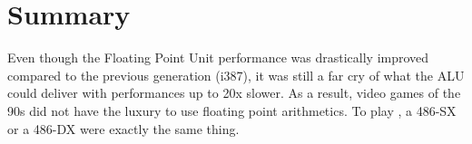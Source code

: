 \section{Summary}

Even though the Floating Point Unit performance was drastically improved compared to the previous generation (i387), it was still a far cry of what the ALU could deliver with performances up to 20x slower. As a result, video games of the 90s did not have the luxury to use floating point arithmetics. To play \doom, a 486-SX or a 486-DX were exactly the same thing.\\
\par